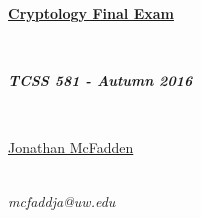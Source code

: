 \documentclass{article}[12]
\numberwithin{equation}{section}
\begin{document}
\begin{center}
\begin{huge} \textbf{\underline{Cryptology Final Exam}} \end{huge} \\
\begin{large} \textbf{\emph{TCSS 581 - Autumn 2016}} \end{large} \\
\vspace{0.2in}
\begin{Large} \underline{Jonathan McFadden} \end{Large} \\
\emph{mcfaddja@uw.edu}
\end{center}
\vspace{0.6in}
\end{document}
